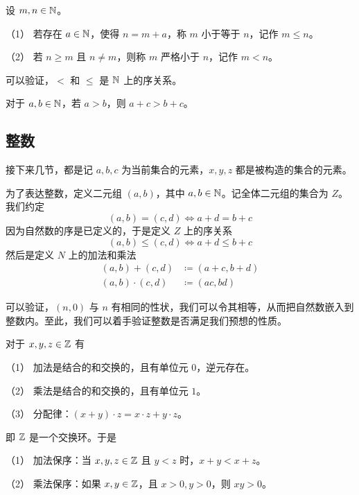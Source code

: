 \begin{definition}[$\NN$ 的序]
	设 $m,n\in \mathbb{N}$。

	（1） 若存在 $a\in \mathbb{N}$，使得 $n=m+a$，称 $m$ 小于等于 $n$，记作 $m \leqslant n$。

	（2） 若 $n\geqslant m$ 且 $n\ne m$，则称 $m$ 严格小于 $n$，记作 $m < n$。
\end{definition}

可以验证，$<$ 和 $\leqslant$ 是 $\NN$ 上的序关系。

\begin{theorem}[加法保序]
	对于 $a,b\in \mathbb{N}$，若 $a>b$，则 $a+c>b+c$。
\end{theorem}

\subsection{整数}

接下来几节，都是记 $a,b,c$ 为当前集合的元素，$x,y,z$ 都是被构造的集合的元素。

为了表达整数，定义二元组 $(a,b)$，其中 $a,b \in \mathbb{N}$。记全体二元组的集合为 $Z$。我们约定
$$(a,b) = (c,d) \Leftrightarrow a+d=b+c$$
因为自然数的序是已定义的，于是定义 $Z$ 上的序关系
$$(a,b) \leqslant (c,d) \Leftrightarrow a+d \leqslant b+c$$
然后是定义 $N$ 上的加法和乘法
\begin{equation*}
	\begin{aligned}
		(a,b) + (c,d)     & \coloneqq  (a+c,b+d) \\
		(a,b) \cdot (c,d) & \coloneqq  (a c,b d)
	\end{aligned}
\end{equation*}

可以验证，$(n,0)$ 与 $n$ 有相同的性状，我们可以令其相等，从而把自然数嵌入到整数内。至此，我们可以着手验证整数是否满足我们预想的性质。

\begin{theorem}[$\ZZ$ 的代数算律]
	对于 $x,y,z\in \mathbb{Z}$ 有

	（1） 加法是结合的和交换的，且有单位元 $0$，逆元存在。

	（2） 乘法是结合的和交换的，且有单位元 $1$。

	（3） 分配律：$(x+y) \cdot  z = x \cdot z + y\cdot z$。
\end{theorem}

即 $\ZZ$ 是一个交换环。于是

\begin{theorem}[$\ZZ$ 是有序域]
	（1） 加法保序：当 $x,y,z\in \mathbb{Z}$ 且 $y<z$ 时，$x+y<x+z$。

	（2） 乘法保序：如果 $x,y\in \mathbb{Z}$，且 $x>0,y>0$，则 $xy>0$。
\end{theorem}


